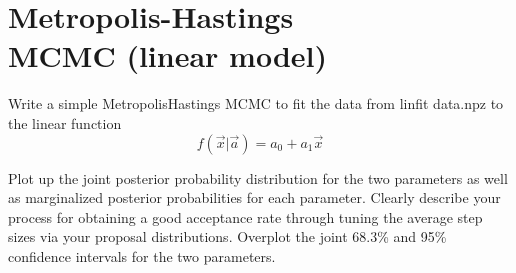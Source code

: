 \section{Metropolis-Hastings \\ MCMC (linear model)}

Write a simple MetropolisHastings MCMC to fit the data from linfit data.npz to the linear function
\begin{equation}
    f(\Vec{x}|\Vec{a})=a_0 + a_1\Vec{x}
\end{equation}

Plot up the joint posterior probability distribution for the two parameters as well as marginalized posterior probabilities for each parameter. Clearly describe your process for obtaining a
good acceptance rate through tuning the average step sizes via your proposal distributions.
Overplot the joint 68.3\% and 95\% confidence intervals for the two parameters.